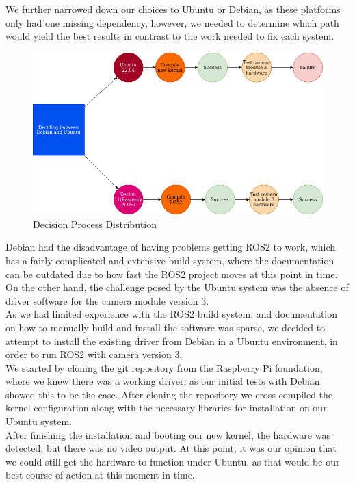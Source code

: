 We further narrowed down our choices to Ubuntu or Debian, as these platforms only had one missing dependency, however, we needed to determine which path would yield the best results in contrast to the work needed to fix each system.\\

\begin{figure}[h]
    \centering
    \includegraphics[scale=0.5]{fig/select_dist.png}
    \caption{Decision Process Distribution}
    \label{fig:distselect}
\end{figure}

Debian had the disadvantage of having problems getting ROS2 to work, which has a fairly complicated and extensive build-system, where the documentation can be outdated due to how fast the ROS2 project moves at this point in time. On the other hand, the challenge posed by the Ubuntu system was the absence of driver software for the camera module version 3. \\

As we had limited experience with the ROS2 build system, and documentation on how to manually build and install the software was sparse, we decided to attempt to install the existing driver from Debian in a Ubuntu environment, in order to run ROS2 with camera version 3. \\

We started by cloning the git repository from the Raspberry Pi foundation, where we knew there was a working driver, as our initial tests with Debian showed this to be the case. After cloning the repository we cross-compiled the kernel configuration along with the necessary libraries for installation on our Ubuntu system. \\

After finishing the installation and booting our new kernel, the hardware was detected, but there was no video output. At this point, it was our opinion that we could still get the hardware to function under Ubuntu, as that would be our best course of action at this moment in time. \\

